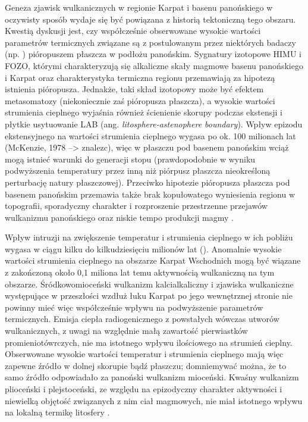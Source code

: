 \documentclass[11.5pt,twoside]{report}
\begin{document}
 Geneza zjawisk wulkanicznych w regionie Karpat i basenu panońskiego w oczywisty sposób wydaje się być powiązana z historią tektoniczną tego obszaru. Kwestią dyskusji jest, czy współcześnie obserwowane wysokie wartości parametrów termicznych związane są z postulowanym przez niektórych badaczy (np. \cite{Wilson.2001}) pióropuszem płaszcza w podłożu panońskim. Sygnatury izotopowe HIMU i FOZO, którymi charakteryzują się alkaliczne skały magmowe basenu panońskiego i Karpat oraz charakterystyka termiczna regionu przemawiają za hipotezą istnienia pióropusza. Jednakże, taki skład izotopowy może być efektem metasomatozy (niekoniecznie zaś pióropusza płaszcza), a wysokie wartości strumienia cieplnego wyjaśnia również ścienienie skorupy podczas ekstensji i płytkie usytuowanie LAB (ang. \textit{litosphere-astenophere boundary}). Wpływ epizodu ekstensyjnego na wartości strumienia cieplnego wygasa po ok. 100 milionach lat (McKenzie, 1978 --> znalezc), więc w płaszczu pod basenem panońskim wciąż mogą istnieć warunki do generacji stopu (prawdopodobnie w wyniku podwyższenia temperatury przez inną niż piórpusz płaszcza nieokreśloną perturbację natury płaszczowej). Przeciwko hipotezie pióropusza płaszcza pod basenem panońskim przemawia także brak kopułowatego wyniesienia regionu w topografii, sporadyczny charakter i rozproszenie przestrzenne przejawów wulkanizmu panońskiego oraz niskie tempo produkcji magmy \parencite{Harangi.2007}.    
 
 Wpływ intruzji na zwiększenie temperatur i strumienia cieplnego w ich pobliżu wygasa w ciągu kilku do kilkudziesięciu milionów lat (\cite{Lenkey.2002,Majorowicz.1975}). Anomalnie wysokie wartości strumienia cieplnego na obszarze Karpat Wschodnich mogą być wiązane z zakończoną około 0,1 miliona lat temu aktywnością wulkaniczną na tym obszarze. Śródkowomioceński wulkanizm kalcialkaliczny i zjawiska wulkaniczne występujące w przeszłości wzdłuż łuku Karpat po jego wewnętrznej stronie nie powinny mieć więc współcześnie wpływu na podwyższenie parametrów termicznych. Emisja ciepła radiogenicznego z powstałych wówczas utworów wulkanicznych, z uwagi na względnie małą zawartość pierwiastków promieniotówrczych, nie ma istotnego wpływu ilościowego na strumień cieplny. Obserwowane wysokie wartości temperatur i strumienia cieplnego mają więc zapewne \'{z}ródło w dolnej skorupie bąd\'{z} płaszczu; domniemywać można, że to samo \'{z}ródło odpowiadało za panoński wulkanizm mioceński. Kwaśny wulkanizm plioceński i plejstoceński, ze względu na epizodyczny charakter aktywności i niewielką objętość związanych z nim ciał magmowych, nie miał istotnego wpływu na lokalną termikę litosfery \parencite{Lenkey.2002}.
 
\end{document}
